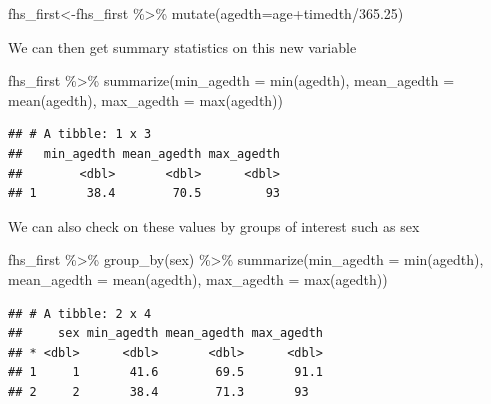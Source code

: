 \documentclass[
]{book}
\newenvironment{Shaded}{\begin{snugshade}}{\end{snugshade}}
\newcommand{\AttributeTok}[1]{\textcolor[rgb]{0.77,0.63,0.00}{#1}}
\newcommand{\FloatTok}[1]{\textcolor[rgb]{0.00,0.00,0.81}{#1}}
\newcommand{\FunctionTok}[1]{\textcolor[rgb]{0.00,0.00,0.00}{#1}}
\newcommand{\NormalTok}[1]{#1}
\newcommand{\OtherTok}[1]{\textcolor[rgb]{0.56,0.35,0.01}{#1}}
\newcommand{\SpecialCharTok}[1]{\textcolor[rgb]{0.00,0.00,0.00}{#1}}
\begin{document}
\begin{Shaded}
\begin{Highlighting}[]
\NormalTok{fhs\_first}\OtherTok{\textless{}{-}}\NormalTok{fhs\_first }\SpecialCharTok{\%\textgreater{}\%} 
\FunctionTok{mutate}\NormalTok{(}\AttributeTok{agedth=}\NormalTok{age}\SpecialCharTok{+}\NormalTok{timedth}\SpecialCharTok{/}\FloatTok{365.25}\NormalTok{)}
\end{Highlighting}
\end{Shaded}

We can then get summary statistics on this new variable

\begin{Shaded}
\begin{Highlighting}[]
\NormalTok{fhs\_first }\SpecialCharTok{\%\textgreater{}\%} 
\FunctionTok{summarize}\NormalTok{(}\AttributeTok{min\_agedth =} \FunctionTok{min}\NormalTok{(agedth),}
\AttributeTok{mean\_agedth =} \FunctionTok{mean}\NormalTok{(agedth),}
\AttributeTok{max\_agedth =} \FunctionTok{max}\NormalTok{(agedth))}
\end{Highlighting}
\end{Shaded}

\begin{verbatim}
## # A tibble: 1 x 3
##   min_agedth mean_agedth max_agedth
##        <dbl>       <dbl>      <dbl>
## 1       38.4        70.5         93
\end{verbatim}

We can also check on these values by groups of interest such as sex

\begin{Shaded}
\begin{Highlighting}[]
\NormalTok{fhs\_first }\SpecialCharTok{\%\textgreater{}\%} 
\FunctionTok{group\_by}\NormalTok{(sex) }\SpecialCharTok{\%\textgreater{}\%}
\FunctionTok{summarize}\NormalTok{(}\AttributeTok{min\_agedth =} \FunctionTok{min}\NormalTok{(agedth),}
\AttributeTok{mean\_agedth =} \FunctionTok{mean}\NormalTok{(agedth),}
\AttributeTok{max\_agedth =} \FunctionTok{max}\NormalTok{(agedth))}
\end{Highlighting}
\end{Shaded}

\begin{verbatim}
## # A tibble: 2 x 4
##     sex min_agedth mean_agedth max_agedth
## * <dbl>      <dbl>       <dbl>      <dbl>
## 1     1       41.6        69.5       91.1
## 2     2       38.4        71.3       93
\end{verbatim}
\end{document}
